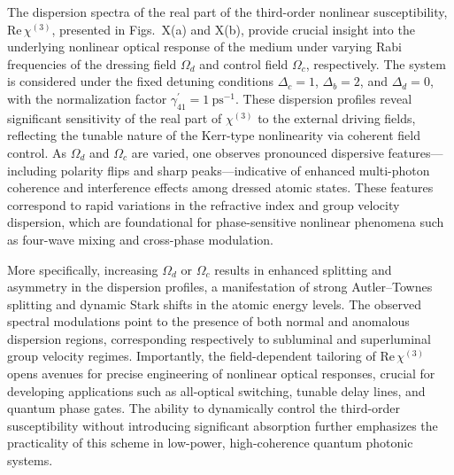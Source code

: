 \documentclass[12pt,a4paper]{article}
\begin{document}
The dispersion spectra of the real part of the third-order nonlinear susceptibility, \(\text{Re}\,\chi^{(3)}\), presented in Figs.~X(a) and X(b), provide crucial insight into the underlying nonlinear optical response of the medium under varying Rabi frequencies of the dressing field \(\Omega_d\) and control field \(\Omega_c\), respectively. The system is considered under the fixed detuning conditions \(\Delta_c = 1\), \(\Delta_b = 2\), and \(\Delta_d = 0\), with the normalization factor \(\gamma_{41}^\prime = 1~\text{ps}^{-1}\). These dispersion profiles reveal significant sensitivity of the real part of \(\chi^{(3)}\) to the external driving fields, reflecting the tunable nature of the Kerr-type nonlinearity via coherent field control. As \(\Omega_d\) and \(\Omega_c\) are varied, one observes pronounced dispersive features—including polarity flips and sharp peaks—indicative of enhanced multi-photon coherence and interference effects among dressed atomic states. These features correspond to rapid variations in the refractive index and group velocity dispersion, which are foundational for phase-sensitive nonlinear phenomena such as four-wave mixing and cross-phase modulation.

More specifically, increasing \(\Omega_d\) or \(\Omega_c\) results in enhanced splitting and asymmetry in the dispersion profiles, a manifestation of strong Autler--Townes splitting and dynamic Stark shifts in the atomic energy levels. The observed spectral modulations point to the presence of both normal and anomalous dispersion regions, corresponding respectively to subluminal and superluminal group velocity regimes. Importantly, the field-dependent tailoring of \(\text{Re}\,\chi^{(3)}\) opens avenues for precise engineering of nonlinear optical responses, crucial for developing applications such as all-optical switching, tunable delay lines, and quantum phase gates. The ability to dynamically control the third-order susceptibility without introducing significant absorption further emphasizes the practicality of this scheme in low-power, high-coherence quantum photonic systems.
\end{document}
